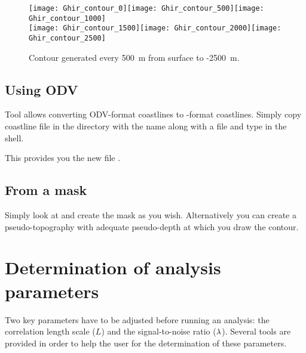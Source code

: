 \begin{figure}[htpb]
\centering
\texttt{[image: Ghir\_contour\_0]}\texttt{[image: Ghir\_contour\_500]}\texttt{[image: Ghir\_contour\_1000]}\\
\texttt{[image: Ghir\_contour\_1500]}\texttt{[image: Ghir\_contour\_2000]}\texttt{[image: Ghir\_contour\_2500]}

\caption{Contour generated every 500~m from surface to -2500~m.\label{fig:contourdepth}}
\end{figure}

\subsection{Using ODV}

Tool  allows converting ODV-format coastlines to \diva-format coastlines. Simply copy coastline file in the  directory with the name  along with a  file and type  in the shell. 

This provides you the new file .



\subsection{From a mask}

Simply look at  and create the mask as you wish. Alternatively you can
create a pseudo-topography with adequate pseudo-depth at which you draw the contour.


\section{Determination of analysis parameters\label{sec:determiationparameters}}

Two key parameters have to be adjusted before running an analysis: the correlation length scale ($L$) and the signal-to-noise ratio ($\lambda$). Several tools are provided in order to help the user for the determination of these parameters.


\subsection{ \label{sec:divafit}}

